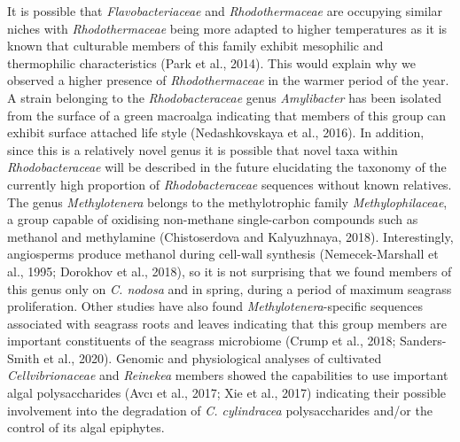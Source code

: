 \documentclass[
  12pt,
]{article}
\begin{document}
It is possible that \emph{Flavobacteriaceae} and \emph{Rhodothermaceae}
are occupying similar niches with \emph{Rhodothermaceae} being more
adapted to higher temperatures as it is known that culturable members of
this family exhibit mesophilic and thermophilic characteristics (Park et
al., 2014). This would explain why we observed a higher presence of
\emph{Rhodothermaceae} in the warmer period of the year. A strain
belonging to the \emph{Rhodobacteraceae} genus \emph{Amylibacter} has
been isolated from the surface of a green macroalga indicating that
members of this group can exhibit surface attached life style
(Nedashkovskaya et al., 2016). In addition, since this is a relatively
novel genus it is possible that novel taxa within
\emph{Rhodobacteraceae} will be described in the future elucidating the
taxonomy of the currently high proportion of \emph{Rhodobacteraceae}
sequences without known relatives. The genus \emph{Methylotenera}
belongs to the methylotrophic family \emph{Methylophilaceae}, a group
capable of oxidising non-methane single-carbon compounds such as
methanol and methylamine (Chistoserdova and Kalyuzhnaya, 2018).
Interestingly, angiosperms produce methanol during cell-wall synthesis
(Nemecek-Marshall et al., 1995; Dorokhov et al., 2018), so it is not
surprising that we found members of this genus only on \emph{C. nodosa}
and in spring, during a period of maximum seagrass proliferation. Other
studies have also found \emph{Methylotenera}-specific sequences
associated with seagrass roots and leaves indicating that this group
members are important constituents of the seagrass microbiome (Crump et
al., 2018; Sanders-Smith et al., 2020). Genomic and physiological
analyses of cultivated \emph{Cellvibrionaceae} and \emph{Reinekea}
members showed the capabilities to use important algal polysaccharides
(Avcı et al., 2017; Xie et al., 2017) indicating their possible
involvement into the degradation of \emph{C. cylindracea}
polysaccharides and/or the control of its algal epiphytes.
\end{document}
